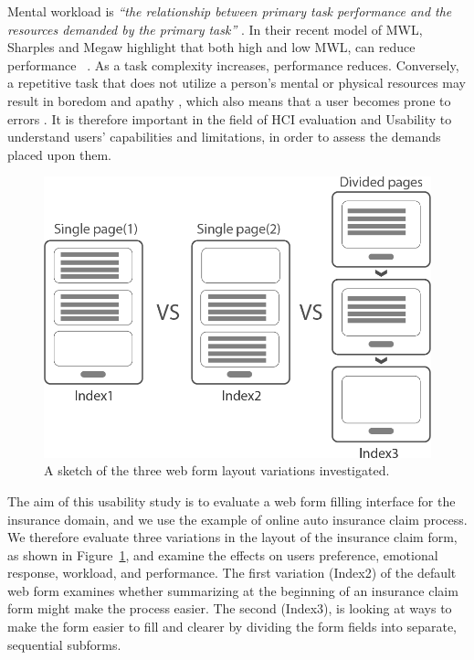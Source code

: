 \documentclass[../main/Feedback.tex]{subfiles}
\begin{document}
Mental workload is \emph{``the relationship between primary task performance and the resources demanded by the primary task''} \cite{wilson2015evaluation}. In their recent model of MWL, Sharples and Megaw highlight that both high and low MWL, can reduce performance ~\cite{wilson2015evaluation}. As a task complexity increases, performance reduces. Conversely, a repetitive task that does not utilize a person's mental or physical resources may result in boredom and apathy \cite{afergan2014dynamic}, which also means that a user becomes prone to errors \cite{pekrun2010boredom}.
It is therefore important in the field of HCI evaluation and Usability to understand users' capabilities and limitations, in order to assess the demands placed upon them.
\begin{figure} [h]
	\centering
	\includegraphics[width=\linewidth]{../figures/layout-variations}
	\caption{A sketch of the three web form layout variations investigated.}
	\label{fig:layout-variations}
\end{figure}

The aim of this usability study is to evaluate a web form filling interface for the insurance domain, and we use the example of online auto insurance claim process.
We therefore evaluate three variations in the layout of the insurance claim form, as shown in Figure~\ref{fig:layout-variations}, and examine the effects on users preference, emotional response, workload, and performance.
The first variation (Index2) of the default web form examines whether summarizing at the beginning of an insurance claim form might make the process easier.
The second (Index3), is looking at ways to make the form easier to fill and clearer by dividing the form fields into separate, sequential subforms.
\end{document}
